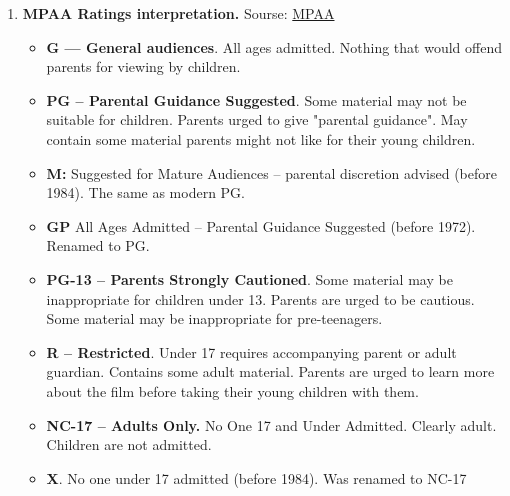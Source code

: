 \documentclass[a4paper,14pt]{article}
\begin{document}
\begin{enumerate}
\item \textbf{MPAA Ratings interpretation. }\label{MPAA}
Sourse: \href{https://en.wikipedia.org/wiki/Motion_Picture_Association_of_America_film_rating_system#From_M_to_GP_to_PG}{MPAA}
\begin{itemize}
\item \textbf{G — General audiences}. All ages admitted. Nothing that would offend parents for viewing by children.
\item \textbf{PG – Parental Guidance Suggested}. Some material may not be suitable for children. Parents urged to give "parental guidance". May contain some material parents might not like for their young children.
\item \textbf{M:} Suggested for Mature Audiences – parental discretion advised (before 1984). The same as modern PG. 
\item \textbf{GP} All Ages Admitted – Parental Guidance Suggested (before 1972). Renamed to PG.
\item \textbf{PG-13 – Parents Strongly Cautioned}. Some material may be inappropriate for children under 13. Parents are urged to be cautious. Some material may be inappropriate for pre-teenagers.
\item \textbf{R – Restricted}. Under 17 requires accompanying parent or adult guardian. Contains some adult material. Parents are urged to learn more about the film before taking their young children with them.
\item \textbf{NC-17 – Adults Only. }No One 17 and Under Admitted. Clearly adult. Children are not admitted.
\item \textbf{X}. No one under 17 admitted (before 1984). Was renamed to NC-17
\end{itemize}

\end{enumerate}


 
\end{document}
